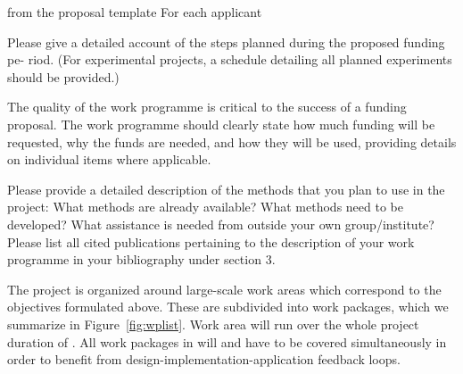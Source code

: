\begin{todo}{from the proposal template}
For each applicant

Please give a detailed account of the steps planned during the proposed funding pe-
riod. (For experimental projects, a schedule detailing all planned experiments should
be provided.)

The quality of the work programme is critical to the success of a funding proposal. The
work programme should clearly state how much funding will be requested, why the
funds are needed, and how they will be used, providing details on individual items
where applicable.

Please provide a detailed description of the methods that you plan to use in the project:
What methods are already available? What methods need to be developed? What assistance is needed from outside your own group/institute?
Please list all cited publications pertaining to the description of your work programme
in your bibliography under section 3.
\end{todo}

The project is organized around  large-scale work areas which correspond
to the objectives formulated above. These are subdivided into  work
packages, which we summarize in Figure~\ref{fig:wplist}. Work area
 will run over the whole project duration of {\pn}. All
{} work packages in {} will and have to be
covered simultaneously in order to benefit from design-implementation-application feedback
loops.

\wpfig

